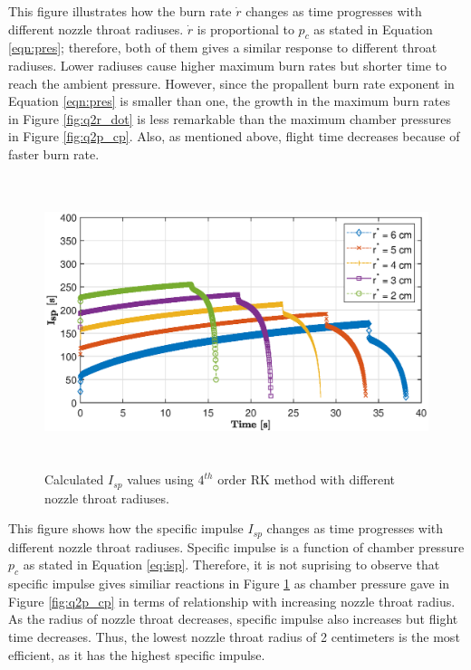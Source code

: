 \documentclass[letterpaper,12pt]{article}
\begin{document}
This figure illustrates how the burn rate $\dot{r}$ changes as time progresses with different nozzle throat radiuses.
$\dot{r}$ is proportional to $p_c$ as stated in Equation \ref{eqn:pres}; therefore, both of them gives 
a similar response to different throat radiuses. 
Lower radiuses cause higher maximum burn rates but shorter time to reach the ambient pressure. 
However, since the propallent burn rate exponent in 
Equation \ref{eqn:pres} is smaller than one, the growth in the maximum burn rates in Figure \ref{fig:q2r_dot} is 
less remarkable than the maximum chamber pressures in Figure \ref{fig:q2p_cp}. Also, as mentioned above,
flight time decreases because of faster burn rate.

\newpage

\begin{figure}[!h]
	\centering
	\includegraphics[height = 8.5cm]{graphs/q2_isp.eps}
	\caption{Calculated $I_{sp}$ values using $4^{th}$ order RK method with different nozzle throat radiuses.}
	\label{fig:q2I_sp}
\end{figure}

This figure shows how the specific impulse $I_{sp}$ changes as time progresses with different nozzle throat radiuses.
Specific impulse is a function of chamber pressure $p_c$ as stated in Equation \ref{eq:isp}. 
Therefore, it is not suprising to observe that specific impulse gives similiar reactions in Figure \ref{fig:q2I_sp} 
as chamber pressure gave in Figure \ref{fig:q2p_cp} in terms of relationship with increasing nozzle throat radius. 
As the radius of nozzle throat decreases, specific impulse also increases but flight time decreases. Thus, the 
lowest nozzle throat radius of 2 centimeters is the most efficient, as it has the highest specific impulse.
\end{document}
